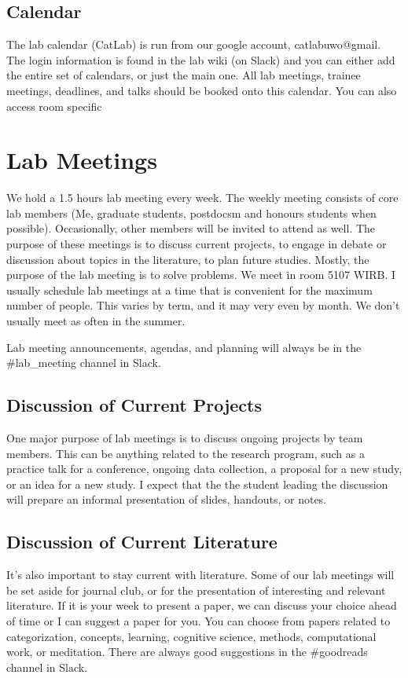 \documentclass{article}
\begin{document}
\subsection{Calendar} The lab calendar (CatLab) is run from our google account, catlabuwo@gmail. The login information is found in the lab wiki (on Slack) and you can either add the entire set of calendars, or just the main one. All lab meetings, trainee meetings, deadlines, and talks should be booked onto this calendar. You can also access room specific 




\section{Lab Meetings} \label{sec:Lab}
We hold a 1.5 hours lab meeting every week. The weekly meeting consists of core lab members (Me, graduate students, postdocsm and honours students when possible). Occasionally, other members will be invited to attend as well. The purpose of these meetings is to discuss current projects, to engage in debate or discussion about topics in the literature, to plan future studies. Mostly, the purpose of the lab meeting is to solve problems. We meet in room 5107 WIRB. I usually schedule lab meetings at a time that is convenient for the maximum number of people. This varies by term, and it may very even by month. We don't usually meet as often in the summer. 

Lab meeting announcements, agendas, and planning will always be in the \#lab\_meeting channel in Slack. 

\subsection {Discussion of Current Projects}
One major purpose of lab meetings is to discuss ongoing projects by team members. This can be anything related to the research program, such as a practice talk for a conference, ongoing data collection, a proposal for a new study, or an idea for a new study. I expect that the the student leading the discussion will prepare an informal presentation of slides, handouts, or notes.

\subsection {Discussion of Current Literature} 
It's also important to stay current with literature. Some of our lab meetings will be set aside for journal club, or for the presentation of interesting and relevant literature. If it is your week to present a paper, we can discuss your choice ahead of time or I can suggest a paper for you. You can choose from papers related to categorization, concepts, learning, cognitive science, methods, computational work, or meditation. There are always good suggestions in the \#goodreads channel in Slack.  
\end{document}
